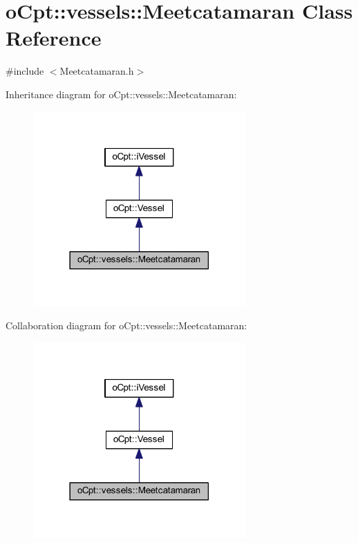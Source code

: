 \hypertarget{classo_cpt_1_1vessels_1_1_meetcatamaran}{}\section{o\+Cpt\+:\+:vessels\+:\+:Meetcatamaran Class Reference}
\label{classo_cpt_1_1vessels_1_1_meetcatamaran}


{\ttfamily \#include $<$Meetcatamaran.\+h$>$}



Inheritance diagram for o\+Cpt\+:\+:vessels\+:\+:Meetcatamaran\+:\nopagebreak
\begin{figure}[H]
\begin{center}
\leavevmode
\includegraphics[width=230pt]{classo_cpt_1_1vessels_1_1_meetcatamaran__inherit__graph}
\end{center}
\end{figure}


Collaboration diagram for o\+Cpt\+:\+:vessels\+:\+:Meetcatamaran\+:\nopagebreak
\begin{figure}[H]
\begin{center}
\leavevmode
\includegraphics[width=230pt]{classo_cpt_1_1vessels_1_1_meetcatamaran__coll__graph}
\end{center}
\end{figure}
